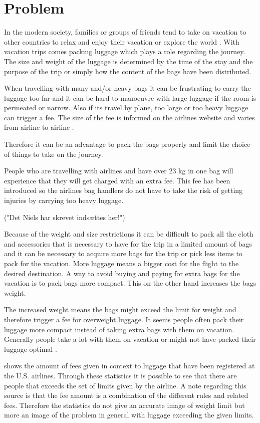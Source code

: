 \section{Problem}
In the modern society, families or groups of friends tend to take on vacation to other countries to relax and enjoy their vacation or explore the world \citep{danskecharter}.
With vacation trips comes packing luggage which plays a role regarding the journey. The size and weight of the luggage is determined by the time of the stay and the purpose of the trip or simply how the content of the bags have been distributed.

When travelling with many and/or heavy bags it can be frustrating to carry the luggage too far and it can be hard to manoeuvre with large luggage if the room is permeated or narrow. Also if its travel by plane, too large or too heavy luggage can trigger a fee. The size of the fee is informed on the airlines website and varies from airline to airline \citep{altombag}.

Therefore it can be an advantage to pack the bags properly and limit the choice of things to take on the journey.

People who are travelling with airlines and have over 23 kg in one bag will experience that they will get charged with an extra fee. This fee has been introduced so the airlines bag handlers do not have to take the risk of getting injuries by carrying too heavy luggage.

("Det Niels har skrevet indsættes her!")

Because of the weight and size restrictions it can be difficult to pack all the cloth and accessories that is necessary to have for the trip in a limited amount of bags and it can be necessary to acquire more bags for the trip or pick less items to pack for the vacation. More luggage means a bigger cost for the flight to the desired destination. A way to avoid buying and paying for extra bags for the vacation is to pack bags more compact. This on the other hand increases the bags weight\citep{altombag}.

The increased weight means the bags might exceed the limit for weight and therefore trigger a fee for overweight luggage.
It seems people often pack their luggage more compact instead of taking extra bags with them on vacation. Generally people take a lot with them on vacation or might not have packed their luggage optimal \citep{airstat}.

\citep{airstat} shows the amount of fees given in context to luggage that have been registered at the U.S. airlines. Through these statistics it is possible to see that there are people that exceeds the set of limits given by the airline. A note regarding this source is that the fee amount is a combination of the different rules and related fees. Therefore the statistics do not give an accurate image of weight limit but more an image of the problem in general with luggage exceeding the given limits.

